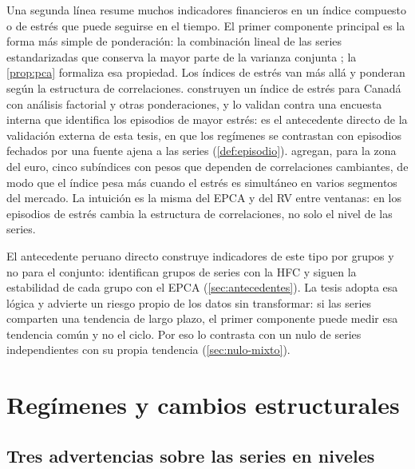 Una segunda línea resume muchos indicadores financieros en un índice compuesto o de estrés que
puede seguirse en el tiempo. El primer componente principal es la forma más simple de ponderación:
la combinación lineal de las series estandarizadas que conserva la mayor parte de la varianza
conjunta \parencite{jolliffe_2002}; la \cref{prop:pca} formaliza
esa propiedad. Los índices de estrés van más allá y ponderan según la estructura de correlaciones.
\textcite{illing_liu_2006} construyen un índice de estrés para Canadá con análisis factorial y
otras ponderaciones, y lo validan contra una encuesta interna que identifica los episodios de mayor
estrés: es el antecedente directo de la validación externa de esta tesis, en que los regímenes se
contrastan con episodios fechados por una fuente ajena a las series (\cref{def:episodio}).
\textcite{hollo_kremer_lo_duca_2012} agregan, para la zona del euro, cinco subíndices con pesos que
dependen de correlaciones cambiantes, de modo que el índice pesa más cuando el estrés es simultáneo
en varios segmentos del mercado. La intuición es la misma del EPCA y del RV entre ventanas: en los
episodios de estrés cambia la estructura de correlaciones, no solo el nivel de las series.

El antecedente peruano directo construye indicadores de este tipo por grupos y no para el
conjunto: \textcite{camiz_cerda_atoche_2026} identifican grupos de series con la HFC y siguen la
estabilidad de cada grupo con el EPCA (\cref{sec:antecedentes}). La tesis adopta esa lógica y
advierte un riesgo propio de los datos sin transformar: si las series comparten una tendencia de
largo plazo, el primer componente puede medir esa tendencia común y no el ciclo. Por eso lo
contrasta con un nulo de series independientes con su propia tendencia (\cref{sec:nulo-mixto}).

\section{Regímenes y cambios estructurales}
\label{sec:ea-regimenes}

\subsection{Tres advertencias sobre las series en niveles}

